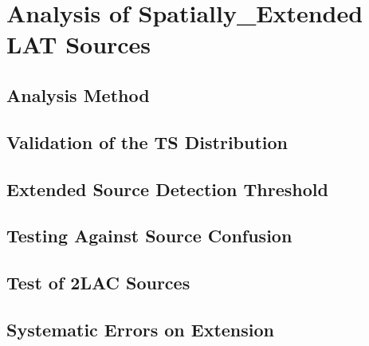
\chapter{Analysis of Spatially_Extended LAT Sources}

\section{Analysis Method}

\section{Validation of the TS Distribution}

\section{Extended Source Detection Threshold}

\section{Testing Against Source Confusion}

\section{Test of 2LAC Sources}

\section{Systematic Errors on Extension}

